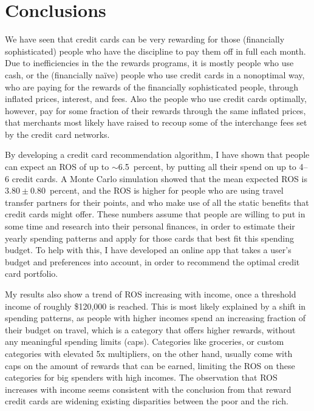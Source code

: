\section{Conclusions} \label{sec:Conclusions}

We have seen that credit cards can be very rewarding for those (financially sophisticated) people who have the discipline to pay them off in full each month.
Due to inefficiencies in the the rewards programs, it is mostly people who use cash, or the (financially na\"{i}ve) people who use credit cards in a nonoptimal way, who are paying for the rewards of the financially sophisticated people, through inflated prices, interest, and fees. 
Also the people who use credit cards optimally, however, pay for some fraction of their rewards through the same inflated prices, that merchants most likely have raised to recoup some of the interchange fees set by the credit card networks.

By developing a credit card recommendation algorithm, I have shown that people can expect an ROS of up to $\sim$6.5~percent, by putting all their spend on up to 4--6 credit cards.
A Monte Carlo simulation showed that the mean expected ROS is $3.80\pm0.80$~percent, and 
the ROS is higher for people who are using travel transfer partners for their points, and who make use of all the static benefits that credit cards might offer.
These numbers assume that people are willing to put in some time and research into their personal finances, in order to estimate their yearly spending patterns and apply for those cards that best fit this spending budget. 
To help with this, I have developed an online app that takes a user's budget and preferences into account, in order to recommend the optimal credit card portfolio.

My results also show a trend of ROS increasing with income, once a threshold income of roughly \$120,000 is reached. 
This is most likely explained by a shift in spending patterns, as people with higher incomes spend an increasing fraction of their budget on travel, which is a category that offers higher rewards, without any meaningful spending limits (caps). 
Categories like groceries, or custom categories with elevated 5x multipliers, on the other hand, usually come with caps on the amount of rewards that can be earned, limiting the ROS on these categories for big spenders with high incomes.
The observation that ROS increases with income seems consistent with the conclusion from \cite{agaretal:2023} that reward credit cards are widening existing disparities between the poor and the rich.

